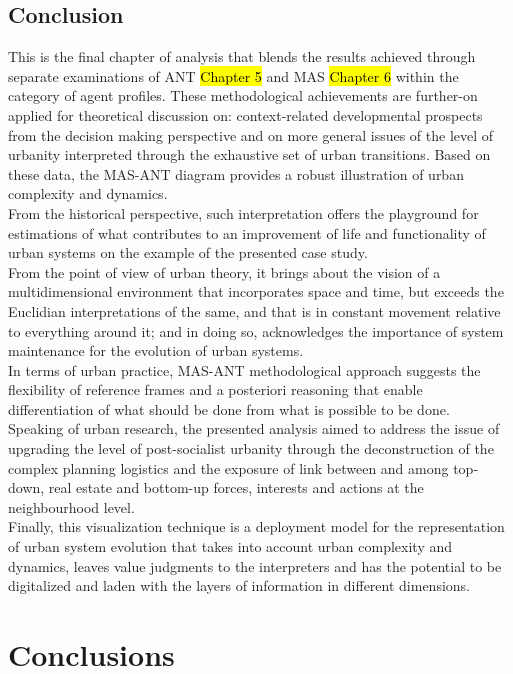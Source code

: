 \documentclass[11pt]{report}
\begin{document}
\section{Conclusion}

This is the final chapter of analysis that blends the results achieved through separate examinations of ANT \hl{Chapter 5} and MAS \hl{Chapter 6} within the category of agent profiles.
These methodological achievements are further-on applied for theoretical discussion on: context-related developmental prospects from the decision making perspective and on more general issues of the level of urbanity interpreted through the exhaustive set of urban transitions.
Based on these data, the MAS-ANT diagram provides a robust illustration of urban complexity and dynamics.
\\
From the historical perspective, such interpretation offers the playground for estimations of what contributes to an improvement of life and functionality of urban systems on the example of the presented case study.
\\
From the point of view of urban theory, it brings about the vision of a multidimensional environment that incorporates space and time, but exceeds the Euclidian interpretations of the same, and that is in constant movement relative to everything around it; and in doing so, acknowledges the importance of system maintenance for the evolution of urban systems. 
\\
In terms of urban practice, MAS-ANT methodological approach suggests the flexibility of reference frames and a posteriori reasoning that enable differentiation of what should be done from what is possible to be done.
\\
Speaking of urban research, the presented analysis aimed to address the issue of upgrading the level of post-socialist urbanity through the deconstruction of the complex planning logistics and the exposure of link between and among top-down, real estate and bottom-up forces, interests and actions at the neighbourhood level. 
\\
Finally, this visualization technique is a deployment model for the representation of urban system evolution that takes into account urban complexity and dynamics, leaves value judgments to the interpreters and has the potential to be digitalized and laden with the layers of information in different dimensions.


\chapter{Conclusions}
\end{document}
